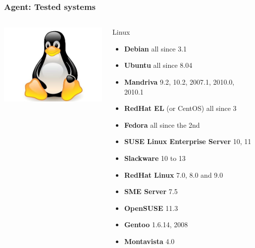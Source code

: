\documentclass{beamer}
\begin{document}
\begin{frame}
    \frametitle{Agent: Tested systems}


 \begin{columns}
 \begin{column}[T]{4cm}
    \includegraphics[height=4.0cm]{pics/os/linux.jpg}
 \end{column}
 \begin{column}[t]{9cm}

    \begin{block}{Linux}
        \begin{itemize}
            \item \textbf{Debian} all since 3.1
            \item \textbf{Ubuntu} all since 8.04
            \item \textbf{Mandriva} 9.2, 10.2, 2007.1, 2010.0, 2010.1
            \item \textbf{RedHat EL} (or CentOS) all since 3
            \item \textbf{Fedora} all since the 2nd
            \item \textbf{SUSE Linux Enterprise Server} 10, 11 
            \item \textbf{Slackware} 10 to 13
            \item \textbf{RedHat Linux} 7.0, 8.0 and 9.0
            \item \textbf{SME Server} 7.5
            \item \textbf{OpenSUSE} 11.3
            \item \textbf{Gentoo} 1.6.14, 2008
            \item \textbf{Montavista} 4.0 
        \end{itemize}
    \end{block}
 \end{column}
\end{columns}


\end{frame}
\end{document}
